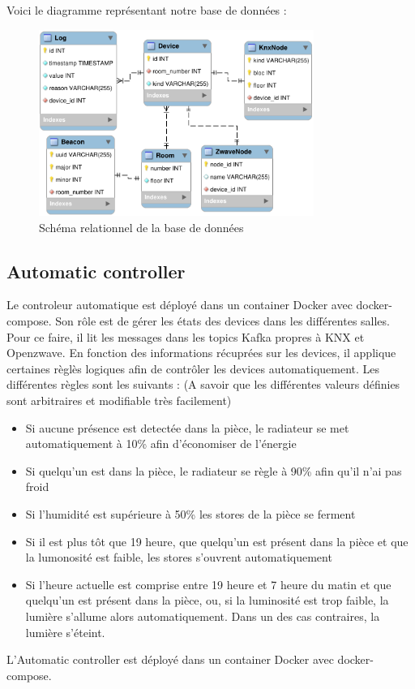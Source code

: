 Voici le diagramme représentant notre base de données :
\begin{figure}
    \begin{center}
        \includegraphics[width=0.8\textwidth]{img/mysql-shema.png}
    \end{center}
    \caption{Schéma relationnel de la base de données}
    \label{db_schema}
\end{figure}

\subsection{Automatic controller}
Le controleur automatique est déployé dans un container Docker avec docker-compose. Son rôle est de gérer les états des devices dans les différentes salles. Pour ce faire, il lit les messages dans les topics Kafka propres à KNX et Openzwave. En fonction des informations récuprées sur les devices, il applique certaines règlès logiques afin de contrôler les devices automatiquement.
Les différentes règles sont les suivants : (A savoir que les différentes valeurs définies sont arbitraires et modifiable très facilement)
\begin{itemize}
  \item Si aucune présence est detectée dans la pièce, le radiateur se met automatiquement à 10\% afin d'économiser de l'énergie
  \item Si quelqu'un est dans la pièce, le radiateur se règle à 90\% afin qu'il n'ai pas froid
  \item Si l'humidité est supérieure à 50\% les stores de la pièce se ferment
  \item Si il est plus tôt que 19 heure, que quelqu'un est présent dans la pièce et que la lumonosité est faible, les stores s'ouvrent automatiquement
  \item Si l'heure actuelle est comprise entre 19 heure et 7 heure du matin et que quelqu'un est présent dans la pièce, ou, si la luminosité est trop faible, la lumière s'allume alors automatiquement. Dans un des cas contraires, la lumière s'éteint.
\end{itemize}
L'Automatic controller est déployé dans un container Docker avec docker-compose.

